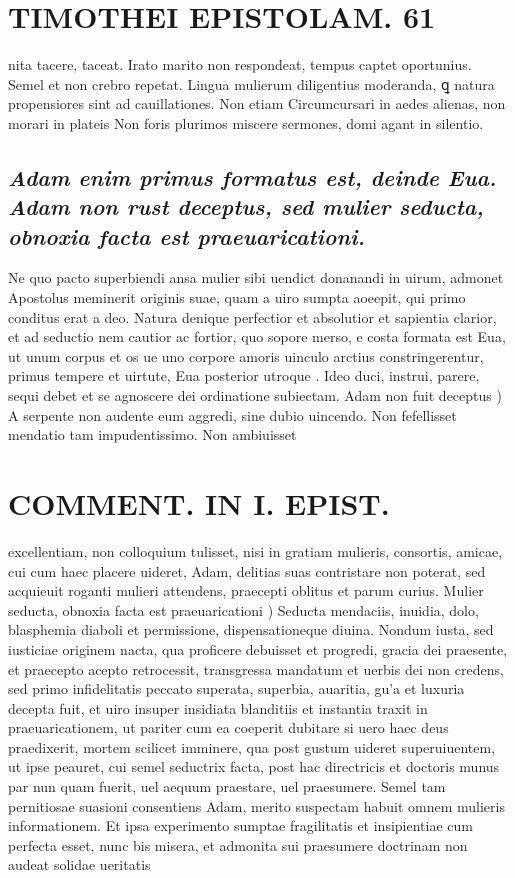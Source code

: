 \documentclass{article}
\begin{document}
\begin{pages}
\section*{TIMOTHEI EPISTOLAM. 61 }\pstart nita tacere, taceat. Irato marito non respondeat, tempus captet oportunius. Semel et non crebro repetat. Lingua mulierum diligentius moderanda, ꝗ natura propensiores sint ad cauillationes. Non etiam Circumcursari in aedes alienas, non morari in plateis Non foris plurimos miscere sermones, domi agant in silentio.  \pend
{}
{}
\subsection*{\textit{Adam enim primus formatus est, deinde Eua. Adam non rust deceptus, sed mulier seducta, obnoxia facta est praeuaricationi. }}\pstart Ne quo pacto superbiendi ansa mulier sibi uendict donanandi in uirum, admonet Apostolus meminerit originis suae, quam a uiro sumpta aoeepit, qui primo conditus erat a deo. Natura denique perfectior et absolutior et sapientia clarior, et ad seductio nem cautior ac fortior, quo sopore merso, e costa formata est Eua, ut unum corpus et os ue uno corpore amoris uinculo arctius constringerentur, primus tempere et uirtute, Eua posterior utroque . Ideo duci, instrui, parere, sequi debet et se agnoscere dei ordinatione subiectam.  \pend\pstart Adam non fuit deceptus ) A serpente non audente eum aggredi, sine dubio uincendo. Non fefellisset mendatio tam impudentissimo. Non ambiuisset  \pend
\section*{COMMENT. IN I. EPIST. }
\marginpar{[ p.62 ]}\pstart excellentiam, non colloquium tulisset, nisi in gratiam mulieris, consortis, amicae, cui cum haec placere uideret, Adam, delitias suas contristare non poterat, sed acquieuit roganti mulieri attendens, praecepti oblitus et parum curius.  \pend\pstart Mulier seducta, obnoxia facta est praeuaricationi )  Seducta mendaciis, inuidia, dolo, blasphemia diaboli et permissione, dispensationeque diuina. Nondum iusta, sed iusticiae originem nacta, qua proficere debuisset et progredi, gracia dei praesente, et praecepto acepto retrocessit, transgressa mandatum et uerbis dei non credens, sed primo infidelitatis peccato superata, superbia, auaritia, gu’a et luxuria decepta fuit, et uiro insuper insidiata blanditiis et instantia traxit in praeuaricationem, ut pariter cum ea coeperit dubitare si uero haec deus praedixerit, mortem scilicet imminere, qua post gustum uideret superuiuentem, ut ipse peauret, cui semel seductrix facta, post hac directricis et doctoris munus par nun quam fuerit, uel aequum praestare, uel praesumere. Semel tam pernitiosae suasioni consentiens Adam, merito suspectam habuit omnem mulieris informationem. Et ipsa experimento sumptae fragilitatis et insipientiae cum perfecta esset, nunc bis misera, et admonita sui praesumere doctrinam non audeat solidae ueritatis  \pend

\end{pages}
\end{document}
